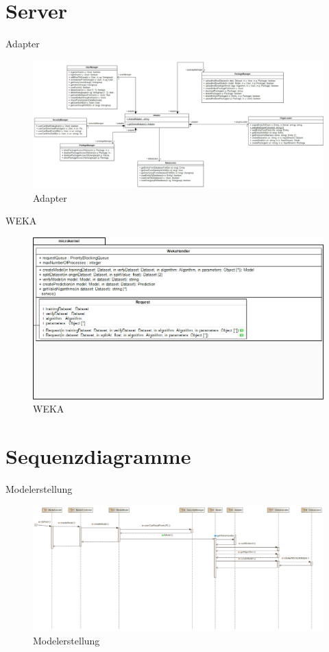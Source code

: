 \documentclass{beamer}
\begin{document}
	\section{Server}
	\begin{frame}{Adapter}
		\begin{figure}
			\hspace*{-35pt}
			\includegraphics[width=1.25\linewidth]{Grafik/Klassendiagramme/adapter}
			\caption{Adapter}
			\label{fig:Adapter}
		\end{figure}
	\end{frame}
	\begin{frame}{WEKA}
		\begin{figure}
			\centering
			\includegraphics[width=1\linewidth]{Grafik/Klassendiagramme/Weka}
			\caption{WEKA}
			\label{fig:WEKA}
		\end{figure}
	\end{frame}
	
	
		\section{Sequenzdiagramme}
		\begin{frame}{Modelerstellung}
			\begin{figure}
				\hspace*{-30pt}
				\includegraphics[width=1.175\linewidth]{Grafik/Sequenzdiagramme/Modelerstellung}
				\caption{Modelerstellung}
				\label{fig:Modelerstellung}
			\end{figure}
		\end{frame}
		
\end{document}
